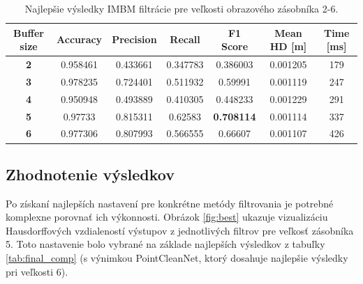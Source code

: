 \begin{table}[h]
	\caption{\label{tab:imbm_best} Najlepšie výsledky IMBM filtrácie pre veľkosti obrazového zásobníka 2-6. }
	\centering
	\begin{tabular}{ccccccc}
		\toprule
		\textbf{Buffer size} & \textbf{Accuracy} & \textbf{Precision} & \textbf{Recall} & \textbf{F1 Score} & \textbf{Mean HD [m]} & \textbf{Time [ms]} \\ 
		\midrule
		\textbf{2}           & 0.958461          & 0.433661           & 0.347783        & 0.386003          & 0.001205          & 179           \\ 
		\textbf{3}           & 0.978235          & 0.724401           & 0.511932        & 0.59991           & 0.001119          & 247           \\ 
		\textbf{4}           & 0.950948          & 0.493889           & 0.410305        & 0.448233          & 0.001229          & 291           \\ 
		\textbf{5}           & 0.97733           & 0.815311           & 0.62583         & \textbf{0.708114}          & 0.001114 & 337           \\ 
		\textbf{6}           & 0.977306          & 0.807993           & 0.566555        & 0.66607           & 0.001107          & 426           \\ 
		\bottomrule
	\end{tabular}
\end{table}

\subsection{Zhodnotenie výsledkov}

Po získaní najlepších nastavení pre konkrétne metódy filtrovania je potrebné komplexne porovnať ich výkonnosti. Obrázok \ref{fig:best} ukazuje vizualizáciu Hausdorffových vzdialeností výstupov z jednotlivých filtrov pre veľkosť zásobníka 5. Toto nastavenie bolo vybrané na základe najlepších výsledkov z tabuľky \ref {tab:final_comp} (s výnimkou PointCleanNet, ktorý dosahuje najlepšie výsledky pri veľkosti 6).

